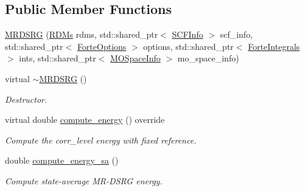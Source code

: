 \subsection*{Public Member Functions}
\begin{DoxyCompactItemize}
\item 
\mbox{\hyperlink{classforte_1_1_m_r_d_s_r_g_af2d113511db2a13aa5ba38b6a20bf114}{M\+R\+D\+S\+RG}} (\mbox{\hyperlink{classforte_1_1_r_d_ms}{R\+D\+Ms}} rdms, std\+::shared\+\_\+ptr$<$ \mbox{\hyperlink{classforte_1_1_s_c_f_info}{S\+C\+F\+Info}} $>$ scf\+\_\+info, std\+::shared\+\_\+ptr$<$ \mbox{\hyperlink{classforte_1_1_forte_options}{Forte\+Options}} $>$ options, std\+::shared\+\_\+ptr$<$ \mbox{\hyperlink{classforte_1_1_forte_integrals}{Forte\+Integrals}} $>$ ints, std\+::shared\+\_\+ptr$<$ \mbox{\hyperlink{classforte_1_1_m_o_space_info}{M\+O\+Space\+Info}} $>$ mo\+\_\+space\+\_\+info)
\item 
virtual \mbox{\hyperlink{classforte_1_1_m_r_d_s_r_g_aa26dc89925e311283d3accd44e6fc988}{$\sim$\+M\+R\+D\+S\+RG}} ()
\begin{DoxyCompactList}\small\item\em Destructor. \end{DoxyCompactList}\item 
virtual double \mbox{\hyperlink{classforte_1_1_m_r_d_s_r_g_a6c9a82cec6600ecbf3b2a0b01d946223}{compute\+\_\+energy}} () override
\begin{DoxyCompactList}\small\item\em Compute the corr\+\_\+level energy with fixed reference. \end{DoxyCompactList}\item 
double \mbox{\hyperlink{classforte_1_1_m_r_d_s_r_g_a8679c6d17eccff44dbc09720e6dd88a2}{compute\+\_\+energy\+\_\+sa}} ()
\begin{DoxyCompactList}\small\item\em Compute state-\/average M\+R-\/\+D\+S\+RG energy. \end{DoxyCompactList}\end{DoxyCompactItemize}
